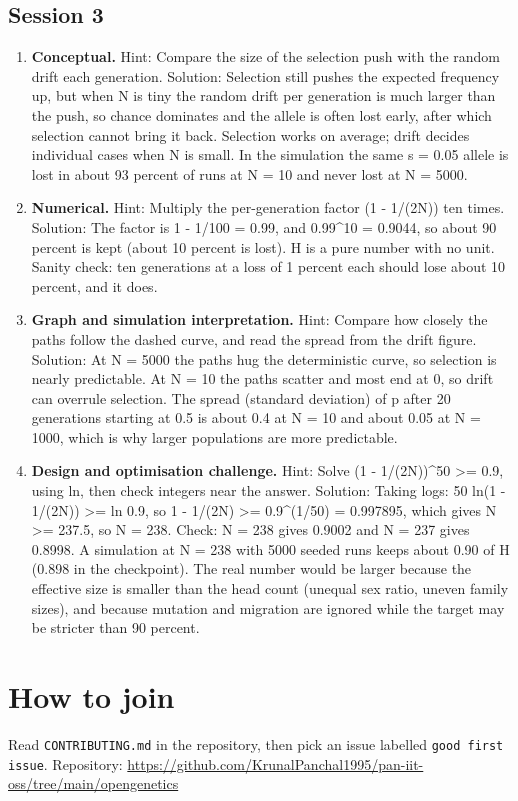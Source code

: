\documentclass[11pt,a4paper]{article}
\begin{document}
\subsection*{Session 3}
\begin{enumerate}[nosep]
\item \textbf{Conceptual.} Hint: Compare the size of the selection push with the random drift each generation. Solution: Selection still pushes the expected frequency up, but when N is tiny the random drift per generation is much larger than the push, so chance dominates and the allele is often lost early, after which selection cannot bring it back. Selection works on average; drift decides individual cases when N is small. In the simulation the same s = 0.05 allele is lost in about 93 percent of runs at N = 10 and never lost at N = 5000.
\item \textbf{Numerical.} Hint: Multiply the per-generation factor (1 - 1/(2N)) ten times. Solution: The factor is 1 - 1/100 = 0.99, and 0.99\textasciicircum{}10 = 0.9044, so about 90 percent is kept (about 10 percent is lost). H is a pure number with no unit. Sanity check: ten generations at a loss of 1 percent each should lose about 10 percent, and it does.
\item \textbf{Graph and simulation interpretation.} Hint: Compare how closely the paths follow the dashed curve, and read the spread from the drift figure. Solution: At N = 5000 the paths hug the deterministic curve, so selection is nearly predictable. At N = 10 the paths scatter and most end at 0, so drift can overrule selection. The spread (standard deviation) of p after 20 generations starting at 0.5 is about 0.4 at N = 10 and about 0.05 at N = 1000, which is why larger populations are more predictable.
\item \textbf{Design and optimisation challenge.} Hint: Solve (1 - 1/(2N))\textasciicircum{}50 \textgreater{}= 0.9, using ln, then check integers near the answer. Solution: Taking logs: 50 ln(1 - 1/(2N)) \textgreater{}= ln 0.9, so 1 - 1/(2N) \textgreater{}= 0.9\textasciicircum{}(1/50) = 0.997895, which gives N \textgreater{}= 237.5, so N = 238. Check: N = 238 gives 0.9002 and N = 237 gives 0.8998. A simulation at N = 238 with 5000 seeded runs keeps about 0.90 of H (0.898 in the checkpoint). The real number would be larger because the effective size is smaller than the head count (unequal sex ratio, uneven family sizes), and because mutation and migration are ignored while the target may be stricter than 90 percent.
\end{enumerate}

\section{How to join}
Read \texttt{CONTRIBUTING.md} in the repository, then pick an issue labelled \texttt{good first issue}. Repository: \url{https://github.com/KrunalPanchal1995/pan-iit-oss/tree/main/opengenetics}
\end{document}
